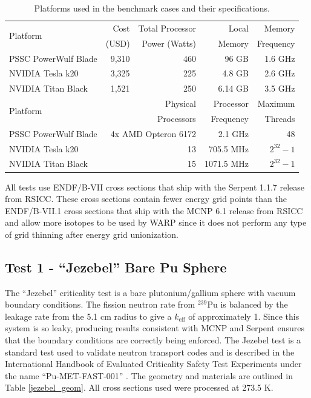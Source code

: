 \documentclass[preprint,12pt]{elsarticle}
\begin{document}
\begin{table}[h]
\centering
\caption{Platforms used in the benchmark cases and their specifications.}
\label{platform_table}
\small
\begin{tabular}{| l | r | r | r | r |}
\hline
\multirow{2}{*}{Platform} &  Cost   &Total Processor  & Local       & Memory     \\
                                       & (USD)  & Power (Watts) & Memory  & Frequency \\
\hline
PSSC PowerWulf Blade       &    9,310   & 460 &  96 GB        &  1.6 GHz                    \\
\hline
NVIDIA Tesla k20         &    3,325     & 225 &  4.8  GB      &  2.6 GHz                  \\
\hline
NVIDIA Titan Black       &     1,521   & 250 &  6.14 GB        & 3.5 GHz              \\
\hline
\hline
\hline
\multirow{2}{*}{Platform}  &  \multicolumn{2}{r|}{Physical }     & Processor  & Maximum \\
                                        & \multicolumn{2}{r|}{Processors}  & Frequency  & Threads \\
\hline
PSSC PowerWulf Blade       &   \multicolumn{2}{r|}{4x AMD Opteron 6172 }  &  2.1 GHz     &  48           \\
\hline
NVIDIA Tesla k20         &       \multicolumn{2}{r|}{13}   &  705.5 MHz     &  $2^{32}-1$           \\
\hline
NVIDIA Titan Black       &      \multicolumn{2}{r|}{ 15 }  &  1071.5 MHz     & $2^{32}-1$           \\
\hline

\end{tabular}
\end{table}

All tests use ENDF/B-VII cross sections that ship with the Serpent 1.1.7 release from RSICC.  These cross sections contain fewer energy grid points than the ENDF/B-VII.1 cross sections that ship with the MCNP 6.1 release from RSICC and allow more isotopes to be used by WARP since it does not perform any type of grid thinning after energy grid unionization.


\subsection{Test 1 - ``Jezebel'' Bare Pu Sphere}

The ``Jezebel'' criticality test is a bare plutonium/gallium sphere with vacuum boundary conditions.   The fission neutron rate from $^{239}$Pu is balanced by the leakage rate from the 5.1 cm radius to give a $k_\mathrm{eff}$ of approximately 1.  Since this system is so leaky, producing results consistent with MCNP and Serpent ensures that the boundary conditions are correctly being enforced.  The Jezebel test is a standard test used to validate neutron transport codes and is described in the International Handbook of Evaluated Criticality Safety Test Experiments under the name ``Pu-MET-FAST-001'' \cite{bench_handbook}.  The geometry and materials are outlined in Table \ref{jezebel_geom}.  All cross sections used were processed at 273.5 K.
\end{document}
